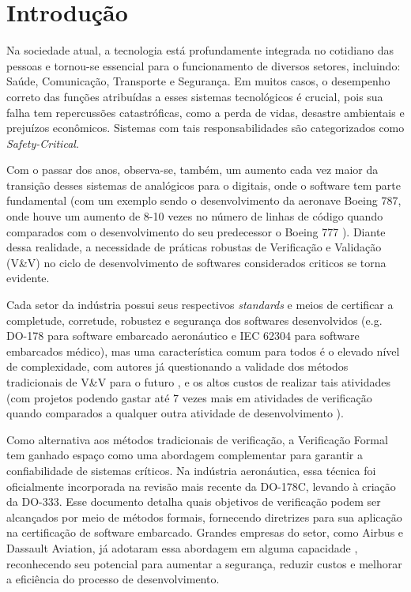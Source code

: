 \documentclass{article}
\begin{document}
\newpage
\tableofcontents
\newpage
\section{Introdução}
    Na sociedade atual, a tecnologia está profundamente integrada no cotidiano das pessoas e tornou-se essencial para o funcionamento de diversos setores, incluindo: Saúde, Comunicação, Transporte e Segurança. 
    Em muitos casos, o desempenho correto das funções atribuídas a esses sistemas tecnológicos é crucial, pois sua falha tem repercussões catastróficas, como a perda de vidas, desastre ambientais e prejuízos econômicos. Sistemas com tais responsabilidades são  categorizados como \emph{Safety-Critical}. 

    Com o passar dos anos, observa-se, também, um aumento cada vez maior da transição desses sistemas de analógicos para o digitais, onde o software tem parte fundamental (com um exemplo sendo o desenvolvimento da aeronave Boeing 787, onde houve um aumento de 8-10 vezes no número de linhas de código quando comparados com o desenvolvimento do seu predecessor o Boeing 777 \cite{do178cguide}). Diante dessa realidade, a necessidade de práticas robustas de Verificação e Validação (V\&V) no ciclo de desenvolvimento de softwares considerados criticos se torna evidente.

    Cada setor da indústria possui seus respectivos \emph{standards} e meios de certificar a completude, corretude, robustez e segurança dos softwares desenvolvidos (e.g. DO-178 para software embarcado aeronáutico e IEC 62304 para software embarcados médico), mas uma característica comum para todos é o elevado nível de complexidade, com autores já questionando a validade dos métodos tradicionais de V\&V para o futuro \cite{rushby2011}, e os altos custos de realizar tais atividades (com projetos podendo gastar até 7 vezes mais em atividades de verificação quando comparados a qualquer outra atividade de desenvolvimento \cite{cofer2012}).

    Como alternativa aos métodos tradicionais de verificação, a Verificação Formal tem ganhado espaço como uma abordagem complementar para garantir a confiabilidade de sistemas críticos. Na indústria aeronáutica, essa técnica foi oficialmente incorporada na revisão mais recente da DO-178C, levando à criação da DO-333. Esse documento detalha quais objetivos de verificação podem ser alcançados por meio de métodos formais, fornecendo diretrizes para sua aplicação na certificação de software embarcado. Grandes empresas do setor, como Airbus e Dassault Aviation, já adotaram essa abordagem em alguma capacidade \cite{cofer2012}\cite{delmas2012}, reconhecendo seu potencial para aumentar a segurança, reduzir custos e melhorar a eficiência do processo de desenvolvimento.
\end{document}
